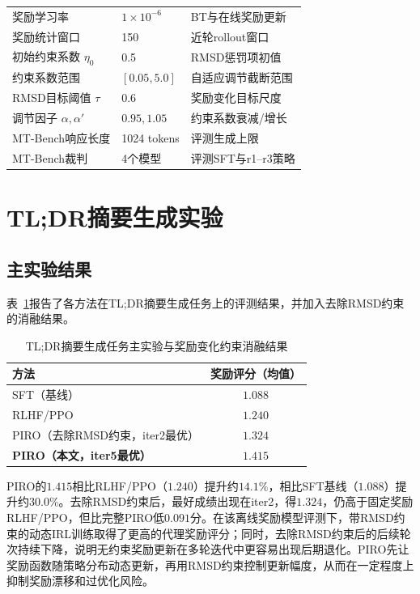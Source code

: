 \begin{table}[htbp]
\begin{tabular*}{0.98\textwidth}{@{\extracolsep{\fill}}lll@{}}
        奖励学习率 & $1\times10^{-6}$ & BT与在线奖励更新 \\
        奖励统计窗口 & 150 & 近轮rollout窗口 \\
        初始约束系数 $\eta_0$ & 0.5 & RMSD惩罚项初值 \\
        约束系数范围 & $[0.05,5.0]$ & 自适应调节截断范围 \\
        RMSD目标阈值 $\tau$ & 0.6 & 奖励变化目标尺度 \\
        调节因子 $\alpha,\alpha'$ & $0.95,1.05$ & 约束系数衰减/增长 \\
        \midrule
        MT-Bench响应长度 & 1024 tokens & 评测生成上限 \\
        MT-Bench裁判 & 4个模型 & 评测SFT与r1--r3策略 \\
        \bottomrule
    \end{tabular*}
\end{table}

\section{TL;DR摘要生成实验}

\subsection{主实验结果}

表~\ref{tab:tldr_main}报告了各方法在TL;DR摘要生成任务上的评测结果，并加入去除RMSD约束的消融结果。

\begin{table}[htbp]
    \centering
    \caption{TL;DR摘要生成任务主实验与奖励变化约束消融结果}
    \label{tab:tldr_main}
    \small
    \renewcommand{\arraystretch}{1.3}
    \begin{tabular}{lc}
        \toprule
        \textbf{方法} & \textbf{奖励评分（均值）} \\
        \midrule
        SFT（基线）                       & $1.088$ \\
        RLHF/PPO\cite{ouyang2022training} & $1.240$ \\
        PIRO（去除RMSD约束，iter2最优） & $1.324$ \\
        \textbf{PIRO（本文，iter5最优）}  & $\mathbf{1.415}$ \\
        \bottomrule
    \end{tabular}
\end{table}

PIRO的$1.415$相比RLHF/PPO（$1.240$）提升约$14.1\%$，相比SFT基线（$1.088$）提升约$30.0\%$。去除RMSD约束后，最好成绩出现在iter2，得$1.324$，仍高于固定奖励RLHF/PPO，但比完整PIRO低$0.091$分。在该离线奖励模型评测下，带RMSD约束的动态IRL训练取得了更高的代理奖励评分；同时，去除RMSD约束后的后续轮次持续下降，说明无约束奖励更新在多轮迭代中更容易出现后期退化。PIRO先让奖励函数随策略分布动态更新，再用RMSD约束控制更新幅度，从而在一定程度上抑制奖励漂移和过优化风险。

